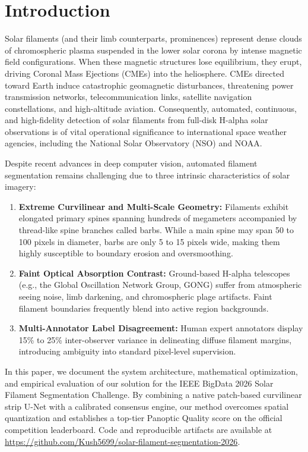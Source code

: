 \documentclass[conference]{IEEEtran}
\begin{document}
\section{Introduction}
Solar filaments (and their limb counterparts, prominences) represent dense clouds of chromospheric plasma suspended in the lower solar corona by intense magnetic field configurations. When these magnetic structures lose equilibrium, they erupt, driving Coronal Mass Ejections (CMEs) into the heliosphere. CMEs directed toward Earth induce catastrophic geomagnetic disturbances, threatening power transmission networks, telecommunication links, satellite navigation constellations, and high-altitude aviation. Consequently, automated, continuous, and high-fidelity detection of solar filaments from full-disk H-alpha solar observations is of vital operational significance to international space weather agencies, including the National Solar Observatory (NSO) and NOAA.

Despite recent advances in deep computer vision, automated filament segmentation remains challenging due to three intrinsic characteristics of solar imagery:
\begin{enumerate}
    \item \textbf{Extreme Curvilinear and Multi-Scale Geometry:} Filaments exhibit elongated primary spines spanning hundreds of megameters accompanied by thread-like spine branches called barbs. While a main spine may span 50 to 100 pixels in diameter, barbs are only 5 to 15 pixels wide, making them highly susceptible to boundary erosion and oversmoothing.
    \item \textbf{Faint Optical Absorption Contrast:} Ground-based H-alpha telescopes (e.g., the Global Oscillation Network Group, GONG) suffer from atmospheric seeing noise, limb darkening, and chromospheric plage artifacts. Faint filament boundaries frequently blend into active region backgrounds.
    \item \textbf{Multi-Annotator Label Disagreement:} Human expert annotators display 15\% to 25\% inter-observer variance in delineating diffuse filament margins, introducing ambiguity into standard pixel-level supervision.
\end{enumerate}

In this paper, we document the system architecture, mathematical optimization, and empirical evaluation of our solution for the IEEE BigData 2026 Solar Filament Segmentation Challenge. By combining a native patch-based curvilinear strip U-Net with a calibrated consensus engine, our method overcomes spatial quantization and establishes a top-tier Panoptic Quality score on the official competition leaderboard. Code and reproducible artifacts are available at \url{https://github.com/Kush5699/solar-filament-segmentation-2026}.
\end{document}
